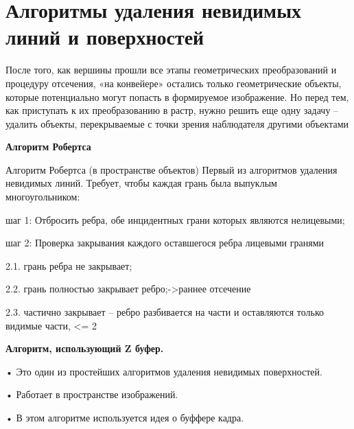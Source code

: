 \section{Алгоритмы удаления невидимых линий и поверхностей}

После того, как вершины прошли все этапы геометрических преобразований и процедуру
отсечения, «на конвейере» остались только геометрические объекты, которые потенциально могут
попасть в формируемое изображение. Но перед тем, как приступать к их преобразованию в растр,
нужно решить еще одну задачу – удалить объекты, перекрываемые с точки зрения наблюдателя
другими объектами 

\textbf{Алгоритм Робертса}

Алгоритм Робертса (в пространстве объектов)
Первый из алгоритмов удаления невидимых линий. Требует,
чтобы каждая грань была выпуклым многоугольником:

шаг 1: Отбросить ребра, обе инцидентных грани которых
являются нелицевыми;

шаг 2: Проверка закрывания каждого оставшегося ребра
лицевыми гранями

2.1. грань ребра не закрывает;

2.2. грань полностью закрывает ребро;->раннее отсечение

2.3. частично закрывает – ребро разбивается на части и
оставляются только видимые части, <= 2 

\textbf{Алгоритм, использующий Z буфер.}

    • Это один из простейших алгоритмов удаления невидимых поверхностей.
    
    • Работает в пространстве изображений.
    
    • В этом алгоритме используется идея о буффере кадра.
    
